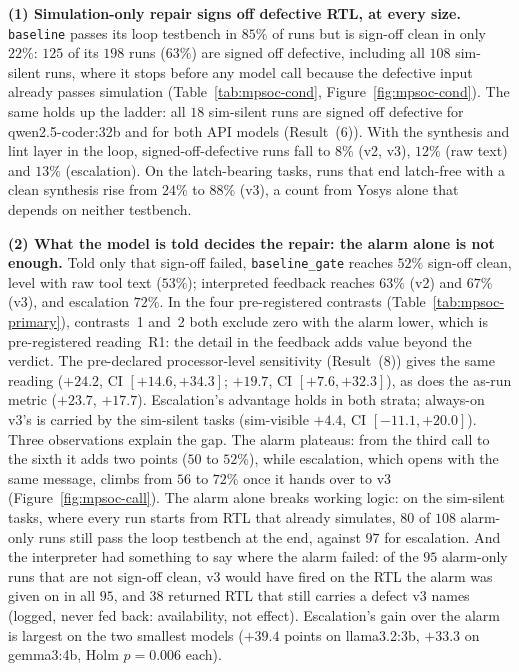 \documentclass[11pt]{article}
\begin{document}
\textbf{(1) Simulation-only repair signs off defective RTL, at every size.}
\texttt{baseline} passes its loop testbench in $85\%$ of runs but is sign-off
clean in only $22\%$: $125$ of its $198$ runs ($63\%$) are signed off
defective, including all $108$ sim-silent runs, where it stops before any model
call because the defective input already passes simulation
(Table~\ref{tab:mpsoc-cond}, Figure~\ref{fig:mpsoc-cond}). The same holds up
the ladder: all $18$ sim-silent runs are signed off defective for
qwen2.5-coder:32b and for both API models (Result~(6)). With the synthesis and
lint layer in the loop, signed-off-defective runs fall to $8\%$ (v2, v3),
$12\%$ (raw text) and $13\%$ (escalation). On the latch-bearing tasks, runs
that end latch-free with a clean synthesis rise from $24\%$ to $88\%$ (v3), a
count from Yosys alone that depends on neither testbench.

\textbf{(2) What the model is told decides the repair: the alarm alone is not
enough.} Told only that sign-off failed, \texttt{baseline\_gate} reaches $52\%$
sign-off clean, level with raw tool text ($53\%$); interpreted feedback reaches
$63\%$ (v2) and $67\%$ (v3), and escalation $72\%$. In the four pre-registered
contrasts (Table~\ref{tab:mpsoc-primary}), contrasts~1 and~2 both exclude zero
with the alarm lower, which is pre-registered reading~R1: the detail in the
feedback adds value beyond the verdict. The pre-declared processor-level
sensitivity (Result~(8)) gives the same reading ($+24.2$, CI $[+14.6,
+34.3]$; $+19.7$, CI $[+7.6, +32.3]$), as does the as-run metric ($+23.7$,
$+17.7$). Escalation's advantage holds in both strata; always-on v3's is
carried by the sim-silent tasks (sim-visible $+4.4$, CI $[-11.1, +20.0]$).
Three observations explain the gap. The alarm plateaus: from the third call to
the sixth it adds two points ($50$ to $52\%$), while escalation, which opens
with the same message, climbs from $56$ to $72\%$ once it hands over to v3
(Figure~\ref{fig:mpsoc-call}). The alarm alone breaks working logic: on the
sim-silent tasks, where every run starts from RTL that already simulates, $80$
of $108$ alarm-only runs still pass the loop testbench at the end, against
$97$ for escalation. And the interpreter had something to say where the alarm
failed: of the $95$ alarm-only runs that are not sign-off clean, v3 would have
fired on the RTL the alarm was given on in all $95$, and $38$ returned RTL
that still carries a defect v3 names (logged, never fed back: availability,
not effect). Escalation's gain over the alarm is largest on the two smallest
models ($+39.4$ points on llama3.2:3b, $+33.3$ on gemma3:4b, Holm $p=0.006$
each).
\end{document}
